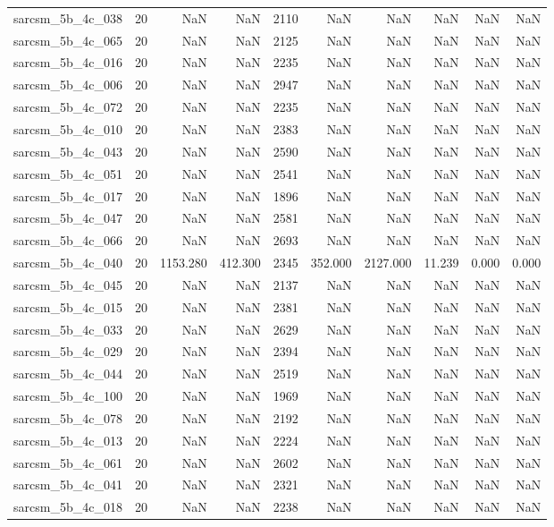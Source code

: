 \begin{tabular}{lrrrrrrrrr}
sarcsm\_5b\_4c\_038 & 20 & NaN & NaN & 2110 & NaN & NaN & NaN & NaN & NaN \\
sarcsm\_5b\_4c\_065 & 20 & NaN & NaN & 2125 & NaN & NaN & NaN & NaN & NaN \\
sarcsm\_5b\_4c\_016 & 20 & NaN & NaN & 2235 & NaN & NaN & NaN & NaN & NaN \\
sarcsm\_5b\_4c\_006 & 20 & NaN & NaN & 2947 & NaN & NaN & NaN & NaN & NaN \\
sarcsm\_5b\_4c\_072 & 20 & NaN & NaN & 2235 & NaN & NaN & NaN & NaN & NaN \\
sarcsm\_5b\_4c\_010 & 20 & NaN & NaN & 2383 & NaN & NaN & NaN & NaN & NaN \\
sarcsm\_5b\_4c\_043 & 20 & NaN & NaN & 2590 & NaN & NaN & NaN & NaN & NaN \\
sarcsm\_5b\_4c\_051 & 20 & NaN & NaN & 2541 & NaN & NaN & NaN & NaN & NaN \\
sarcsm\_5b\_4c\_017 & 20 & NaN & NaN & 1896 & NaN & NaN & NaN & NaN & NaN \\
sarcsm\_5b\_4c\_047 & 20 & NaN & NaN & 2581 & NaN & NaN & NaN & NaN & NaN \\
sarcsm\_5b\_4c\_066 & 20 & NaN & NaN & 2693 & NaN & NaN & NaN & NaN & NaN \\
sarcsm\_5b\_4c\_040 & 20 & 1153.280 & 412.300 & 2345 & 352.000 & 2127.000 & 11.239 & 0.000 & 0.000 \\
sarcsm\_5b\_4c\_045 & 20 & NaN & NaN & 2137 & NaN & NaN & NaN & NaN & NaN \\
sarcsm\_5b\_4c\_015 & 20 & NaN & NaN & 2381 & NaN & NaN & NaN & NaN & NaN \\
sarcsm\_5b\_4c\_033 & 20 & NaN & NaN & 2629 & NaN & NaN & NaN & NaN & NaN \\
sarcsm\_5b\_4c\_029 & 20 & NaN & NaN & 2394 & NaN & NaN & NaN & NaN & NaN \\
sarcsm\_5b\_4c\_044 & 20 & NaN & NaN & 2519 & NaN & NaN & NaN & NaN & NaN \\
sarcsm\_5b\_4c\_100 & 20 & NaN & NaN & 1969 & NaN & NaN & NaN & NaN & NaN \\
sarcsm\_5b\_4c\_078 & 20 & NaN & NaN & 2192 & NaN & NaN & NaN & NaN & NaN \\
sarcsm\_5b\_4c\_013 & 20 & NaN & NaN & 2224 & NaN & NaN & NaN & NaN & NaN \\
sarcsm\_5b\_4c\_061 & 20 & NaN & NaN & 2602 & NaN & NaN & NaN & NaN & NaN \\
sarcsm\_5b\_4c\_041 & 20 & NaN & NaN & 2321 & NaN & NaN & NaN & NaN & NaN \\
sarcsm\_5b\_4c\_018 & 20 & NaN & NaN & 2238 & NaN & NaN & NaN & NaN & NaN \\

\end{tabular}
